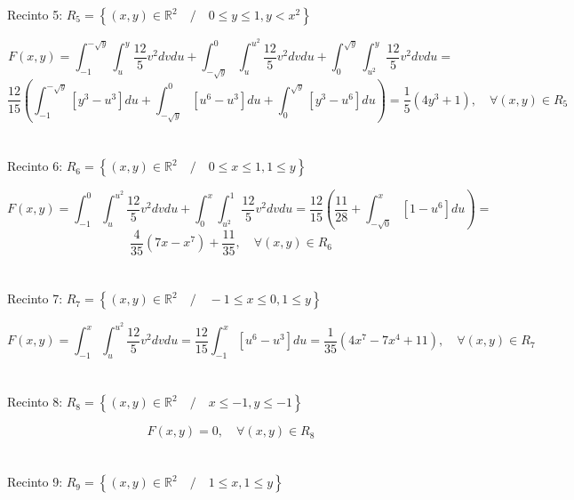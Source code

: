 \documentclass[a4paper, 12pt]{article}
\def\R{\mathds{R}}
\begin{document}
    Recinto 5: $R_5=\left\{(x,y) \in \R^2 \quad / \quad 0\leq y \leq 1, y<x^2\right\}$

    $$F(x,y)=\int _{-1}^{-\sqrt{y}} \int _{u}^y \frac{12}{5}v^2 dvdu + \int _{-\sqrt{y}}^0\int _{u}^{u^2} \frac{12}{5}v^2 dvdu + \int _{0}^{\sqrt{y}} \int _{u^2}^y \frac{12}{5}v^2 dvdu= 
    $$$$\frac{12}{15} \left(\int _{-1}^{-\sqrt{y}} \left[y^3-u^3\right] du + \int _{-\sqrt{y}}^0 \left[u^6-u^3\right]du + \int _{0}^{\sqrt{y}} \left[y^3-u^6\right] du\right) =
    \frac{1}{5}\left(4y^3+1\right), \quad \forall (x,y) \in R_5$$\\ \\

    Recinto 6: $R_6=\left\{(x,y) \in \R^2 \quad / \quad 0\leq x \leq 1, 1\leq y\right\}$

    $$F(x,y)=\int _{-1}^{0} \int _{u}^{u^2} \frac{12}{5}v^2 dvdu + \int _{0}^x\int _{u^2}^{1} \frac{12}{5}v^2 dvdu= 
    \frac{12}{15} \left(\frac{11}{28} + \int _{-\sqrt{0}}^x \left[1-u^6\right] du\right) =
    $$$$\frac{4}{35}\left(7x-x^7\right) + \frac{11}{35}, \quad \forall (x,y) \in R_6$$\\ \\

    Recinto 7: $R_7=\left\{(x,y) \in \R^2 \quad / \quad -1 \leq x \leq 0, 1\leq y\right\}$

    $$F(x,y)=\int _{-1}^{x} \int _{u}^{u^2} \frac{12}{5}v^2 dvdu = 
    \frac{12}{15} \int _{-1}^{x} \left[u^6-u^3\right] du =
    \frac{1}{35}\left(4x^7-7x^4+11\right), \quad \forall (x,y) \in R_7$$\\ \\

    Recinto 8: $R_8=\left\{(x,y) \in \R^2 \quad / \quad x \leq -1, y\leq -1\right\}$

    $$F(x,y)=0, \quad \forall (x,y) \in R_8$$\\ \\

    Recinto 9: $R_9=\left\{(x,y) \in \R^2 \quad / \quad 1 \leq x, 1\leq y\right\}$
\end{document}

